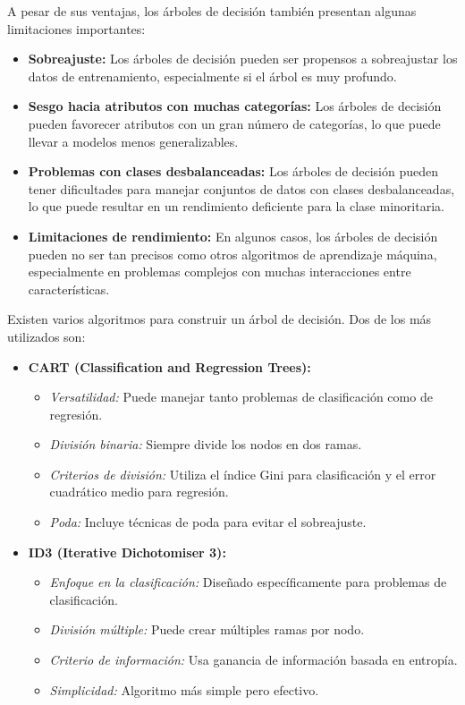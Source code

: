\documentclass[12pt]{article}
\begin{document}
A pesar de sus ventajas, los árboles de decisión también presentan algunas limitaciones importantes:
\begin{itemize}
    \item \textbf{Sobreajuste:} Los árboles de decisión pueden ser propensos a sobreajustar los datos de entrenamiento, especialmente si el árbol es muy profundo.
    \item \textbf{Sesgo hacia atributos con muchas categorías:} Los árboles de decisión pueden favorecer atributos con un gran número de categorías, lo que puede llevar a modelos menos generalizables.
    \item \textbf{Problemas con clases desbalanceadas:} Los árboles de decisión pueden tener dificultades para manejar conjuntos de datos con clases desbalanceadas, lo que puede resultar en un rendimiento deficiente para la clase minoritaria.
    \item \textbf{Limitaciones de rendimiento:} En algunos casos, los árboles de decisión pueden no ser tan precisos como otros algoritmos de aprendizaje máquina, especialmente en problemas complejos con muchas interacciones entre características.
\end{itemize}

Existen varios algoritmos para construir un árbol de decisión. Dos de los más utilizados son:
\begin{itemize}
    \item \textbf{CART (Classification and Regression Trees):}
    \begin{itemize}
        \item \textit{Versatilidad:} Puede manejar tanto problemas de clasificación como de regresión.
        \item \textit{División binaria:} Siempre divide los nodos en dos ramas.
        \item \textit{Criterios de división:} Utiliza el índice Gini para clasificación y el error cuadrático medio para regresión.
        \item \textit{Poda:} Incluye técnicas de poda para evitar el sobreajuste.
    \end{itemize}
    \item \textbf{ID3 (Iterative Dichotomiser 3):}
    \begin{itemize}
        \item \textit{Enfoque en la clasificación:} Diseñado específicamente para problemas de clasificación.
        \item \textit{División múltiple:} Puede crear múltiples ramas por nodo.
        \item \textit{Criterio de información:} Usa ganancia de información basada en entropía.
        \item \textit{Simplicidad:} Algoritmo más simple pero efectivo.
    \end{itemize}
\end{itemize}
\end{document}
